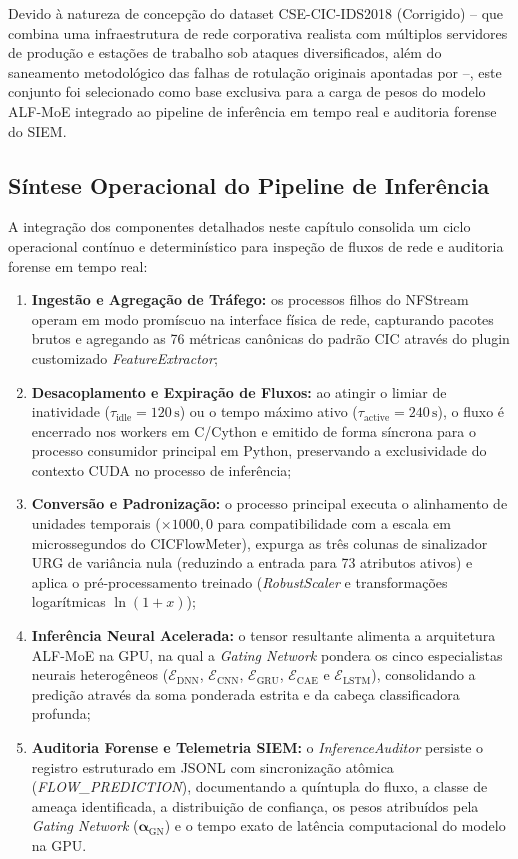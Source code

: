 Devido à natureza de concepção do dataset CSE-CIC-IDS2018 (Corrigido) -- que combina uma infraestrutura de rede
corporativa realista com múltiplos servidores de produção e estações de trabalho sob ataques diversificados, além do
saneamento metodológico das falhas de rotulação originais apontadas por  --, este conjunto
foi selecionado como base exclusiva para a carga de pesos do modelo ALF-MoE integrado ao pipeline de inferência em
tempo real e auditoria forense do SIEM.

\subsection{Síntese Operacional do Pipeline de Inferência}
\label{subsec:sintese_pipeline_operacional}

A integração dos componentes detalhados neste capítulo consolida um ciclo operacional contínuo e determinístico para
inspeção de fluxos de rede e auditoria forense em tempo real:
\begin{enumerate}
    \item \textbf{Ingestão e Agregação de Tráfego:} os processos filhos do NFStream operam em modo promíscuo na
    interface física de rede, capturando pacotes brutos e agregando as 76 métricas canônicas do padrão CIC através do
    plugin customizado \emph{FeatureExtractor};
    \item \textbf{Desacoplamento e Expiração de Fluxos:} ao atingir o limiar de inatividade
    ($\tau_{\mathrm{idle}} = 120\,\mathrm{s}$) ou o tempo máximo ativo ($\tau_{\mathrm{active}} = 240\,\mathrm{s}$),
    o fluxo é encerrado nos workers em C/Cython e emitido de forma síncrona para o processo consumidor principal em
    Python, preservando a exclusividade do contexto CUDA no processo de inferência;
    \item \textbf{Conversão e Padronização:} o processo principal executa o alinhamento de unidades temporais
    ($\times 1000{,}0$ para compatibilidade com a escala em microssegundos do CICFlowMeter), expurga as três colunas
    de sinalizador URG de variância nula (reduzindo a entrada para 73 atributos ativos) e aplica o pré-processamento
    treinado (\emph{RobustScaler} e transformações logarítmicas $\ln(1+x)$);
    \item \textbf{Inferência Neural Acelerada:} o tensor resultante alimenta a arquitetura ALF-MoE na GPU, na qual a
    \emph{Gating Network} pondera os cinco especialistas neurais heterogêneos ($\mathcal{E}_{\mathrm{DNN}}$,
    $\mathcal{E}_{\mathrm{CNN}}$, $\mathcal{E}_{\mathrm{GRU}}$, $\mathcal{E}_{\mathrm{CAE}}$ e
    $\mathcal{E}_{\mathrm{LSTM}}$), consolidando a predição através da soma ponderada estrita e da cabeça classificadora
    profunda;
    \item \textbf{Auditoria Forense e Telemetria SIEM:} o \emph{InferenceAuditor} persiste o registro estruturado em
    JSONL com sincronização atômica (\emph{FLOW\_PREDICTION}), documentando a quíntupla do fluxo, a classe de ameaça
    identificada, a distribuição de confiança, os pesos atribuídos pela \emph{Gating Network}
    ($\boldsymbol{\alpha}_{\mathrm{GN}}$) e o tempo exato de latência computacional do modelo na GPU.
\end{enumerate}

